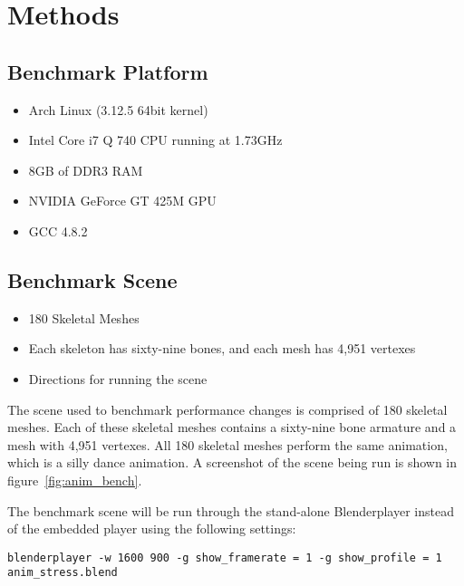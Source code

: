 \section{Methods}

\subsection{Benchmark Platform}
\label{sec:bench_platform}
\ifsummaries
\begin{itemize}
 \item Arch Linux (3.12.5 64bit kernel)
 \item Intel Core i7 Q 740 CPU running at 1.73GHz
 \item 8GB of DDR3 RAM
 \item NVIDIA GeForce GT 425M GPU
 \item GCC 4.8.2
\end{itemize}
\fi


\subsection{Benchmark Scene}
\label{sec:bench_scene}
\ifsummaries
\begin{itemize}
 \item 180 Skeletal Meshes
 \item Each skeleton has sixty-nine bones, and each mesh has 4,951 vertexes
 \item Directions for running the scene
\end{itemize}
\fi

The scene used to benchmark performance changes is comprised of 180 skeletal meshes.
Each of these skeletal meshes contains a sixty-nine bone armature and a mesh with 4,951 vertexes.
All 180 skeletal meshes perform the same animation, which is a silly dance animation.
A screenshot of the scene being run is shown in figure~\ref{fig:anim_bench}.


The benchmark scene will be run through the stand-alone Blenderplayer instead of the embedded player using the following settings:
\begin{verbatim}
blenderplayer -w 1600 900 -g show_framerate = 1 -g show_profile = 1 anim_stress.blend
\end{verbatim}

